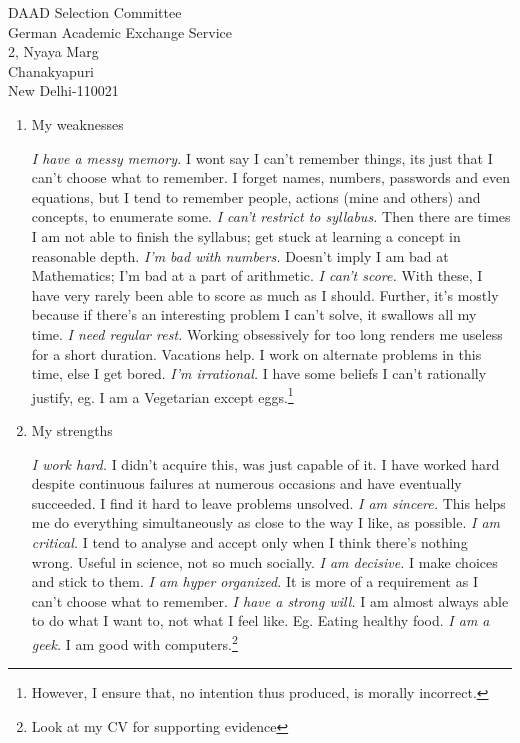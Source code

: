 \documentclass{letter}
\begin{document}
\begin{letter}{DAAD Selection Committee\\German Academic Exchange Service\\2, Nyaya Marg\\Chanakyapuri\\New Delhi-110021}
\begin{enumerate}

\item My weaknesses

\emph{I have a messy memory.} I wont say I can't remember things, its just that I can't choose what to remember. I forget names, numbers, passwords and even equations, but I tend to remember people, actions (mine and others) and concepts, to enumerate some.
\emph{I can't restrict to syllabus.} Then there are times I am not able to finish the syllabus; get stuck at learning a concept in reasonable depth.
\emph{I'm bad with numbers.} Doesn't imply I am bad at Mathematics; I'm bad at a part of arithmetic.
\emph{I can't score.} With these, I have very rarely been able to score as much as I should. Further, it's mostly because if there's an interesting problem I can't solve, it swallows all my time. 
\emph{I need regular rest.} Working obsessively for too long renders me useless for a short duration. Vacations help. I work on alternate problems in this time, else I get bored.
\emph{I'm irrational.} I have some beliefs I can't rationally justify, eg. I am a Vegetarian except eggs.\footnote{However, I ensure that, no intention thus produced, is morally incorrect.}

\item My strengths

\emph{I work hard.} I didn't acquire this, was just capable of it. I have worked hard despite continuous failures at numerous occasions and have eventually succeeded. I find it hard to leave problems unsolved.
\emph{I am sincere.} This helps me do everything simultaneously as close to the way I like, as possible.
\emph{I am critical.} I tend to analyse and accept only when I think there's nothing wrong. Useful in science, not so much socially.
\emph{I am decisive.} I make choices and stick to them.
\emph{I am hyper organized.} It is more of a requirement as I can't choose what to remember.
\emph{I have a strong will.} I am almost always able to do what I want to, not what I feel like. Eg. Eating healthy food.
\emph{I am a geek.} I am good with computers.\footnote{Look at my CV for supporting evidence}



\end{enumerate}
\end{letter}
\end{document}
